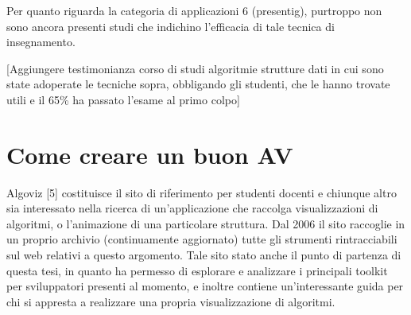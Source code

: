 Per quanto riguarda la categoria di applicazioni 6 (presentig), purtroppo
non sono ancora presenti studi che indichino l'efficacia di tale tecnica
di insegnamento.

{[}Aggiungere testimonianza corso di studi algoritmie strutture dati
in cui sono state adoperate le tecniche sopra, obbligando gli studenti,
che le hanno trovate utili e il 65\% ha passato l'esame al primo colpo{]}


\section{Come creare un buon AV}

Algoviz {[}5{]} costituisce il sito di riferimento per studenti docenti
e chiunque altro sia interessato nella ricerca di un'applicazione
che raccolga visualizzazioni di algoritmi, o l'animazione di una particolare
struttura. Dal 2006 il sito raccoglie in un proprio archivio (continuamente
aggiornato) tutte gli strumenti rintracciabili sul web relativi a
questo argomento. Tale sito stato anche il punto di partenza di questa
tesi, in quanto ha permesso di esplorare e analizzare i principali
toolkit per sviluppatori presenti al momento, e inoltre contiene un'interessante
guida per chi si appresta a realizzare una propria visualizzazione
di algoritmi.

